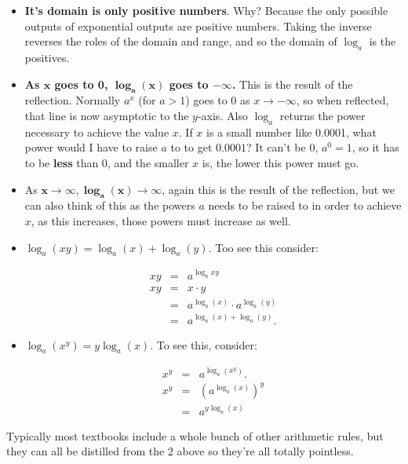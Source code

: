 \begin{itemize}
\item \textbf{It's domain is only positive numbers}.  Why?  Because the only possible outputs of exponential outputs are positive numbers.  Taking the inverse reverses the roles of the domain and range, and so the domain of $\log_a$ is the positives.
\item \textbf{As $\mathbf{x}$ goes to 0, $ \mathbf{\log_a(x)}$ goes to $\mathbf{-\infty}$.}   This is the result of the reflection.  Normally $a^x$ (for $a>1$) goes to 0 as $x\to -\infty$, so when reflected, that line is now asymptotic to the $y$-axis.  Also $\log_a$ returns the power necessary to achieve the value $x$.  If $x$ is a small number like 0.0001, what power would I have to raise $a$ to to get $0.0001$?  It can't be 0, $a^0=1$, so it has to be \textbf{less} than 0, and the smaller $x$ is, the lower this power must go.

\item  As $\mathbf{x\to\infty, \log_a(x)\to \infty}$, again this is the result  of the reflection, but we can also think of this as the powers $a$ needs to be raised to in order to achieve $x$, as this increases, those powers must increase as well.

\item $\log_a(xy)=\log_a(x)+\log_a(y)$. Too see this consider:

\begin{eqnarray*}
xy&=&a^{\log_a{xy}}\\
xy&=&x\cdot y\\
&=&a^{\log_a(x)}\cdot a^{\log_a(y)}\\
&=&a^{\log_a(x)+\log_a(y)}.
\end{eqnarray*}


\item $\log_a(x^y)=y\log_a(x)$.  To see this, consider:

\begin{eqnarray*}
x^y&=&a^{\log_a(x^y)}.\\
x^y&=&(a^{\log_a(x)})^y\\
&=&a^{y\log_a(x)}
\end{eqnarray*}



\end{itemize}

Typically most textbooks include a whole bunch of other arithmetic rules, but they can all be distilled from the 2 above so they're all totally pointless.\\

